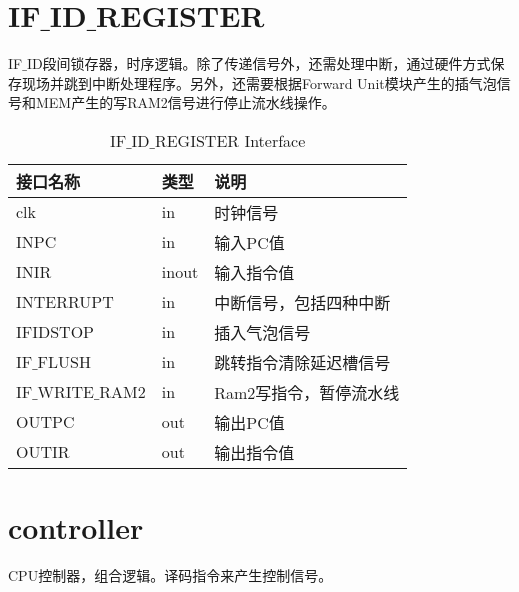 \section{IF$\_$ID$\_$REGISTER}

IF$\_$ID段间锁存器，时序逻辑。除了传递信号外，还需处理中断，通过硬件方式保存现场并跳到中断处理程序。另外，还需要根据Forward Unit模块产生的插气泡信号和MEM产生的写RAM2信号进行停止流水线操作。

\begin{table}[H]
\begin{center}
\renewcommand{\arraystretch}{1.3}
\small
\caption{IF$\_$ID$\_$REGISTER Interface}
\label{tab:treatments}
\begin{tabular}{|p{3cm}<{\centering}|p{1.4cm}<{\centering}|p{7cm}<{\centering}|}
\hline
接口名称 & 类型 & 说明 \\
\hline
clk & in & 时钟信号 \\
\hline
INPC & in & 输入PC值 \\
\hline
INIR & inout & 输入指令值 \\
\hline
INTERRUPT & in & 中断信号，包括四种中断 \\
\hline
IFIDSTOP & in & 插入气泡信号 \\
\hline
IF$\_$FLUSH & in & 跳转指令清除延迟槽信号 \\
\hline
IF$\_$WRITE$\_$RAM2 & in & Ram2写指令，暂停流水线 \\
\hline
OUTPC & out & 输出PC值 \\
\hline
OUTIR & out &  输出指令值\\
\hline
\end{tabular}
\end{center}
\end{table}


\section{controller}

CPU控制器，组合逻辑。译码指令来产生控制信号。

